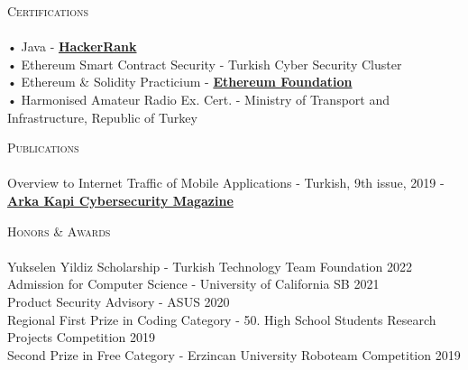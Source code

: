 \documentclass[a4paper]{article}
\newcommand{\lineunder} {
    \vspace*{-8pt} \\
    \hspace*{-18pt} \hrulefill \\
}
\newcommand{\header} [1] {
    {\hspace*{-18pt}\vspace*{6pt} \textsc{#1}}
    \vspace*{-6pt} \lineunder
}
\begin{document}
      \header{Certifications}
      \vspace{2mm}
      • Java - \textbf{\href{https://www.hackerrank.com/certificates/1b2ac3ee91da}{HackerRank}}\\
\vspace*{1mm}
      • Ethereum Smart Contract Security - Turkish Cyber Security Cluster\\
\vspace*{1mm}
      • Ethereum \& Solidity Practicium - \textbf{\href{https://verified.sertifier.com/en/verify/85223213010096}{Ethereum Foundation}}\\
\vspace*{1mm}
      • Harmonised Amateur Radio Ex. Cert. - Ministry of Transport and Infrastructure, Republic of Turkey\\
\vspace*{1mm}
      \vspace{2mm}

       \header{Publications}
      \vspace{2mm}
      Overview to Internet Traffic of Mobile Applications - Turkish, 9th issue, 2019 - \textbf{\href{https://arkakapimag.com}{Arka Kapi Cybersecurity Magazine}}\\
      

\vspace*{1mm}
      \vspace{2mm}

\header{Honors \& Awards}
      \vspace{2mm} 
      Yukselen Yildiz Scholarship - Turkish Technology Team Foundation 2022\\
\vspace*{1mm}
      Admission for Computer Science - University of California SB 2021\\
\vspace*{1mm}
      Product Security Advisory - ASUS 2020\\
\vspace*{1mm}
      Regional First Prize in Coding Category - 50. High School Students Research Projects Competition 2019\\
\vspace*{1mm}
      Second Prize in Free Category - Erzincan University Roboteam Competition 2019\\
\vspace*{1mm}

    \ 
    
\end{document}
